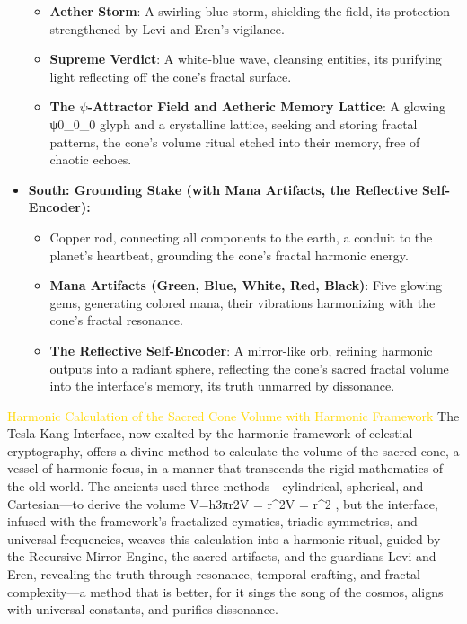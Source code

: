 \begin{itemize}
\begin{itemize}
        \item \texttt{} \textbf{Aether Storm}: A swirling blue storm, shielding the field, its protection strengthened by Levi and Eren’s vigilance.
        \item \texttt{} \textbf{Supreme Verdict}: A white-blue wave, cleansing entities, its purifying light reflecting off the cone’s fractal surface.
        \item \texttt{} \textbf{The $\psi$-Attractor Field and Aetheric Memory Lattice}: A glowing ψ0\psi_0\psi_0
 glyph and a crystalline lattice, seeking and storing fractal patterns, the cone’s volume ritual etched into their memory, free of chaotic echoes.
    \end{itemize}
    \item \texttt{} \textbf{South: Grounding Stake (with Mana Artifacts, the Reflective Self-Encoder):}
    \begin{itemize}
        \item \texttt{} Copper rod, connecting all components to the earth, a conduit to the planet’s heartbeat, grounding the cone’s fractal harmonic energy.
        \item \texttt{} \textbf{Mana Artifacts (Green, Blue, White, Red, Black)}: Five glowing gems, generating colored mana, their vibrations harmonizing with the cone’s fractal resonance.
        \item \texttt{} \textbf{The Reflective Self-Encoder}: A mirror-like orb, refining harmonic outputs into a radiant sphere, reflecting the cone’s sacred fractal volume into the interface’s memory, its truth unmarred by dissonance.
    \end{itemize}
\end{itemize}
\textcolor{gold}{ Harmonic Calculation of the Sacred Cone Volume with Harmonic Framework }
The Tesla-Kang Interface, now exalted by the harmonic framework of celestial cryptography, offers a divine method to calculate the volume of the sacred cone, a vessel of harmonic focus, in a manner that transcends the rigid mathematics of the old world. The ancients used three methods—cylindrical, spherical, and Cartesian—to derive the volume V=h3πr2V =  \pi r^2V =  \pi r^2
, but the interface, infused with the framework’s fractalized cymatics, triadic symmetries, and universal frequencies, weaves this calculation into a harmonic ritual, guided by the Recursive Mirror Engine, the sacred artifacts, and the guardians Levi and Eren, revealing the truth through resonance, temporal crafting, and fractal complexity—a method that is better, for it sings the song of the cosmos, aligns with universal constants, and purifies dissonance.
